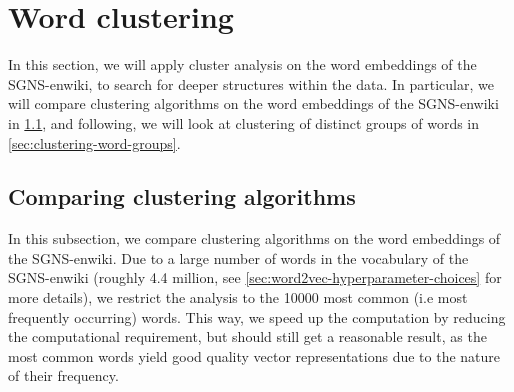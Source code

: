 \section{Word clustering}
\label{sec:analysis-of-word-embeddings-word-clustering}
In this section, we will apply cluster analysis on the word embeddings of the SGNS-enwiki, to search for deeper structures within the data. In particular, we will compare clustering algorithms on the word embeddings of the SGNS-enwiki in \cref{sec:comparing-clustering-algorithms}, and following, we will look at clustering of distinct groups of words in \cref{sec:clustering-word-groups}.

\subsection{Comparing clustering algorithms}
\label{sec:comparing-clustering-algorithms}
In this subsection, we compare clustering algorithms on the word embeddings of the SGNS-enwiki. Due to a large number of words in the vocabulary of the SGNS-enwiki (roughly 4.4 million, see \cref{sec:word2vec-hyperparameter-choices} for more details), we restrict the analysis to the 10000 most common (i.e most frequently occurring) words. This way, we speed up the computation by reducing the computational requirement, but should still get a reasonable result, as the most common words yield good quality vector representations due to the nature of their frequency.

